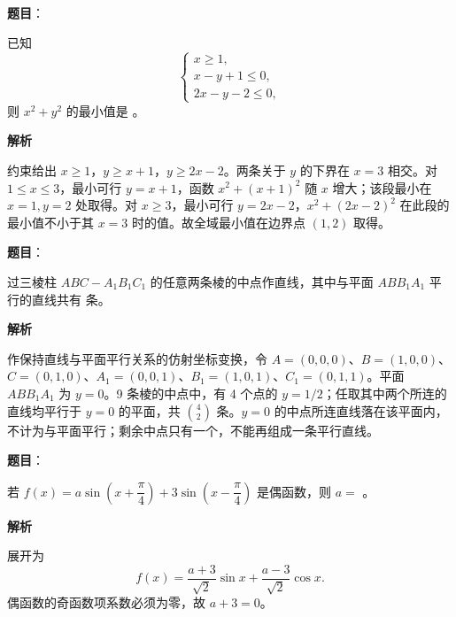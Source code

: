 \begin{answer}

\textbf{题目}：

已知
\nopagebreak[4]
\[
\begin{cases}
x\geqslant1,\\
x-y+1\leqslant0,\\
2x-y-2\leqslant0,
\end{cases}
\]
则 $x^2+y^2$ 的最小值是 \gkblank{}。

\textbf{解析}

约束给出 $x\geqslant1$，$y\geqslant x+1$，$y\geqslant2x-2$。两条关于 $y$ 的下界在 $x=3$ 相交。对 $1\leqslant x\leqslant3$，最小可行 $y=x+1$，函数 $x^2+(x+1)^2$ 随 $x$ 增大；该段最小在 $x=1,y=2$ 处取得。对 $x\geqslant3$，最小可行 $y=2x-2$，$x^2+(2x-2)^2$ 在此段的最小值不小于其 $x=3$ 时的值。故全域最小值在边界点 $(1,2)$ 取得。


\end{answer}
\begin{answer}

\textbf{题目}：

过三棱柱 $ABC-A_1B_1C_1$ 的任意两条棱的中点作直线，其中与平面 $ABB_1A_1$ 平行的直线共有 \gkblank{} 条。

\textbf{解析}

作保持直线与平面平行关系的仿射坐标变换，令 $A=(0,0,0)$、$B=(1,0,0)$、$C=(0,1,0)$、$A_1=(0,0,1)$、$B_1=(1,0,1)$、$C_1=(0,1,1)$。平面 $ABB_1A_1$ 为 $y=0$。9 条棱的中点中，有 4 个点的 $y=1/2$；任取其中两个所连的直线均平行于 $y=0$ 的平面，共 $\binom42$ 条。$y=0$ 的中点所连直线落在该平面内，不计为与平面平行；剩余中点只有一个，不能再组成一条平行直线。


\end{answer}
\begin{answer}

\textbf{题目}：

若 $f(x)=a\sin\left(x+\dfrac{\pi}{4}\right)+3\sin\left(x-\dfrac{\pi}{4}\right)$ 是偶函数，则 $a=$ \gkblank{}。

\textbf{解析}

展开为
\nopagebreak[4]
\[
f(x)=\frac{a+3}{\sqrt2}\sin x+\frac{a-3}{\sqrt2}\cos x.
\]
偶函数的奇函数项系数必须为零，故 $a+3=0$。


\end{answer}
